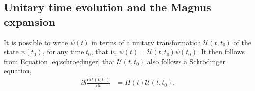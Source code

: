 \documentclass{jors}
\begin{document}

	
	\subsection{Unitary time evolution and the Magnus expansion}
		It is possible to write \(\psi(t)\) in terms of a unitary transformation \(\mathcal{U}(t, t_0)\) of the state \(\psi(t_0)\), for any time \(t_0\), that is, \(\psi(t) = \mathcal{U}(t, t_0)\psi(t_0)\).
		It then follows from Equation \eqref{eq:schroedinger} that \(\mathcal{U}(t, t_0)\) also follows a Schr\"{o}dinger equation,
		\begin{align}
			i\hbar\frac{\mathrm{d}\mathcal{U}(t, t_0)}{\mathrm{d}t} &= H(t)\mathcal{U}(t, t_0).\label{eq:unitary_schroedinger}
		\end{align}
\end{document}
